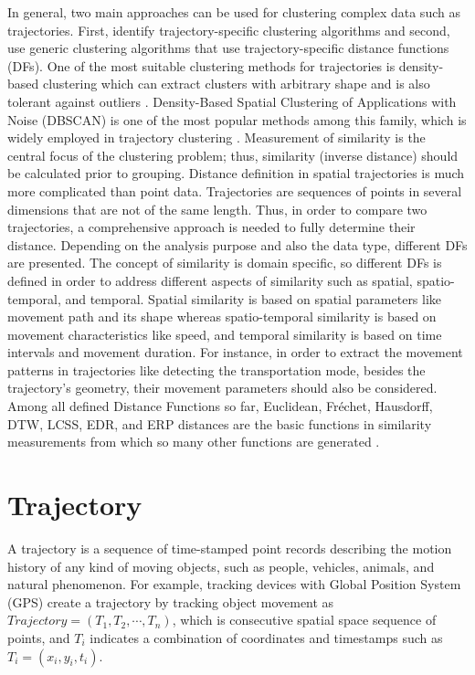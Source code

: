 \documentclass[a4paper, 12pt]{article}
\begin{document}
In general, two main approaches can be used for clustering complex data such as trajectories. First, identify trajectory-specific clustering algorithms and second, use generic clustering algorithms that use trajectory-specific distance functions (DFs). One of the most suitable clustering methods for trajectories is density-based clustering \citep{kriegel2011density} which can extract clusters with arbitrary shape and is also tolerant against outliers \citep{ester1996density}. Density-Based Spatial Clustering of Applications with Noise (DBSCAN) is one of the most popular methods among this family, which is widely employed in trajectory clustering \citep{zhao2019trajectory,cheng2018density,chen2011clustering,lee2007trajectory}. Measurement of similarity is the central focus of the clustering problem; thus, similarity (inverse distance) should be calculated prior to grouping. Distance definition in spatial trajectories is much more complicated than point data. Trajectories are sequences of points in several dimensions that are not of the same length. Thus, in order to compare two trajectories, a comprehensive approach is needed to fully determine their distance. Depending on the analysis purpose and also the data type, different DFs are presented. The concept of similarity is domain specific, so different DFs is defined in order to address different aspects of similarity such as spatial, spatio-temporal, and temporal. Spatial similarity is based on spatial parameters like movement path and its shape whereas spatio-temporal similarity is based on movement characteristics like speed, and temporal similarity is based on time intervals and movement duration. For instance, in order to extract the movement patterns in trajectories like detecting the transportation mode, besides the trajectory’s geometry, their movement parameters should also be considered. Among all defined Distance Functions so far, Euclidean, Fréchet, Hausdorff, DTW, LCSS, EDR, and ERP distances are the basic functions in similarity measurements from which so many other functions are generated \citep{abbaspour2017method,aghabozorgi2015time,wang2013effectiveness}.

\section{Trajectory}
A trajectory is a sequence of time-stamped point records describing the motion history of any kind of moving objects, such as people, vehicles, animals, and natural phenomenon. For example, tracking devices with Global Position System (GPS) create a trajectory by tracking object movement as $Trajectory=(T_{1},T_{2},\cdots,T_{n})$, which is consecutive spatial space sequence of points, and $T_{i}$ indicates a combination of coordinates and timestamps such as $T_i=(x_{i},y_{i},t_{i})$.
\end{document}
